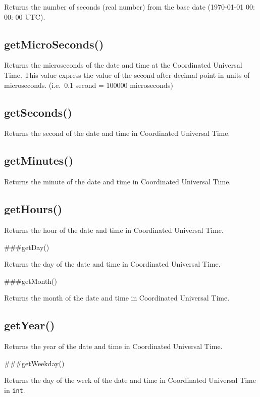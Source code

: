 \documentclass[]{book}
\begin{document}
Returns the number of seconds (real number) from the base date (1970-01-01 00: 00: 00 UTC).

\hypertarget{getmicroseconds}{%
\subsection{getMicroSeconds()}\label{getmicroseconds}}

Returns the microseconds of the date and time at the Coordinated Universal Time. This value express the value of the second after decimal point in units of microseconds. (i.e.~0.1 second = 100000 microseconds)

\hypertarget{getseconds}{%
\subsection{getSeconds()}\label{getseconds}}

Returns the second of the date and time in Coordinated Universal Time.

\hypertarget{getminutes}{%
\subsection{getMinutes()}\label{getminutes}}

Returns the minute of the date and time in Coordinated Universal Time.

\hypertarget{gethours}{%
\subsection{getHours()}\label{gethours}}

Returns the hour of the date and time in Coordinated Universal Time.

\#\#\#getDay()

Returns the day of the date and time in Coordinated Universal Time.

\#\#\#getMonth()

Returns the month of the date and time in Coordinated Universal Time.

\hypertarget{getyear-1}{%
\subsection{getYear()}\label{getyear-1}}

Returns the year of the date and time in Coordinated Universal Time.

\#\#\#getWeekday()

Returns the day of the week of the date and time in Coordinated Universal Time in \texttt{int}.
\end{document}
